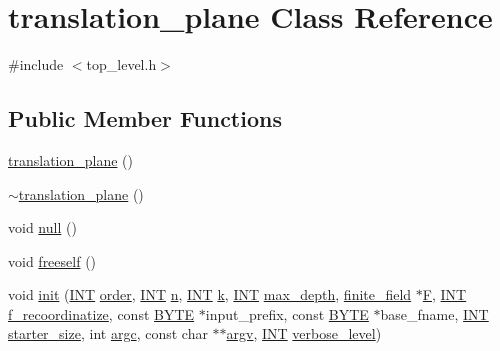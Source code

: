 \hypertarget{classtranslation__plane}{}\section{translation\+\_\+plane Class Reference}
\label{classtranslation__plane}


{\ttfamily \#include $<$top\+\_\+level.\+h$>$}

\subsection*{Public Member Functions}
\begin{DoxyCompactItemize}
\item 
\mbox{\hyperlink{classtranslation__plane_a46ea87bb5b48082d4789b50b31adc726}{translation\+\_\+plane}} ()
\item 
\mbox{\hyperlink{classtranslation__plane_a9e36439535b5996814cbb0c7e2753fa2}{$\sim$translation\+\_\+plane}} ()
\item 
void \mbox{\hyperlink{classtranslation__plane_abdb35dc7ca796051b5339a7947af67d9}{null}} ()
\item 
void \mbox{\hyperlink{classtranslation__plane_a1d01b522aea53c628d79e71970fa2818}{freeself}} ()
\item 
void \mbox{\hyperlink{classtranslation__plane_a7a3382d4458a09f7ff1fc1ac257ee6fb}{init}} (\mbox{\hyperlink{galois_8h_a09fddde158a3a20bd2dcadb609de11dc}{I\+NT}} \mbox{\hyperlink{classtranslation__plane_adb931afef4a5007998d86c0d787b1461}{order}}, \mbox{\hyperlink{galois_8h_a09fddde158a3a20bd2dcadb609de11dc}{I\+NT}} \mbox{\hyperlink{classtranslation__plane_a9590b758c78c73a1ea845952c1fcb41b}{n}}, \mbox{\hyperlink{galois_8h_a09fddde158a3a20bd2dcadb609de11dc}{I\+NT}} \mbox{\hyperlink{classtranslation__plane_a2344d30e5bf39474048c6f7b456578e4}{k}}, \mbox{\hyperlink{galois_8h_a09fddde158a3a20bd2dcadb609de11dc}{I\+NT}} \mbox{\hyperlink{classtranslation__plane_a70fa92d9cbc48aa6eda39bdb5817272b}{max\+\_\+depth}}, \mbox{\hyperlink{classfinite__field}{finite\+\_\+field}} $\ast$\mbox{\hyperlink{classtranslation__plane_ab2c1432717ccb20ff2b21ac9e47df5ea}{F}}, \mbox{\hyperlink{galois_8h_a09fddde158a3a20bd2dcadb609de11dc}{I\+NT}} \mbox{\hyperlink{classtranslation__plane_ae0c765cfe0be40c41e4d8cde7d6ac7cd}{f\+\_\+recoordinatize}}, const \mbox{\hyperlink{galois_8h_ab6cc7b4aeb6ea31aba2b3fbfc83ff5e6}{B\+Y\+TE}} $\ast$input\+\_\+prefix, const \mbox{\hyperlink{galois_8h_ab6cc7b4aeb6ea31aba2b3fbfc83ff5e6}{B\+Y\+TE}} $\ast$base\+\_\+fname, \mbox{\hyperlink{galois_8h_a09fddde158a3a20bd2dcadb609de11dc}{I\+NT}} \mbox{\hyperlink{classtranslation__plane_af588f45c7596baa1ca64824395eb1fa1}{starter\+\_\+size}}, int \mbox{\hyperlink{classtranslation__plane_a6e0bdfa36a5bcd759183492ca85a30fa}{argc}}, const char $\ast$$\ast$\mbox{\hyperlink{classtranslation__plane_af80b3c04fbcbf95a32c0621de19fb0ab}{argv}}, \mbox{\hyperlink{galois_8h_a09fddde158a3a20bd2dcadb609de11dc}{I\+NT}} \mbox{\hyperlink{simeon_8_c_a818073fbcc2f439e7c56952f67386122}{verbose\+\_\+level}})
$$
\end{DoxyCompactItemize}

